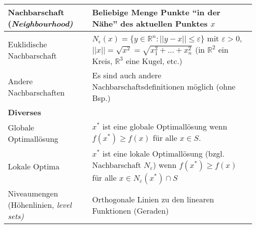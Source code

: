 \begin{tabularx}{\textwidth}{p{7cm} X}
    \textbf{Nachbarschaft (\em Neighbourhood\em)} & Beliebige Menge Punkte "`in der Nähe"' des aktuellen Punktes $x$\\
  \hline
    Euklidische Nachbarschaft
      & $N_\epsilon(x) = \{ y \in \mathbb{R}^n: ||y-x|| \leq \varepsilon \}$ mit $\varepsilon > 0$, $||x|| = \sqrt{x^2} = \sqrt{x_1^2 + ... + x_n^2}$ (in $\mathbb{R}^2$ ein Kreis, $\mathbb{R}^3$ eine Kugel, etc.)\\
    Andere Nachbarschaften
      & Es sind auch andere Nachbarschaftsdefinitionen möglich (ohne Bsp.)\\
  \hline
    \textbf{Diverses} &\\
  \hline
      Globale Optimallösung
      & $x^*$ ist eine globale Optimallösung wenn $f(x^*) \geq f(x)$ für alle $x \in S$.\\
    Lokale Optima
      & $x^*$ ist eine lokale Optimallösung (bzgl. Nachbarschaft $N_\varepsilon$) wenn $f(x^*) \geq f(x)$ für alle $x \in N_\varepsilon(x^*) \cap S$\\
    Niveaumengen (Höhenlinien, \em level sets\em)
      & Orthogonale Linien zu den linearen Funktionen (Geraden)\\      
  \end{tabularx}
  

